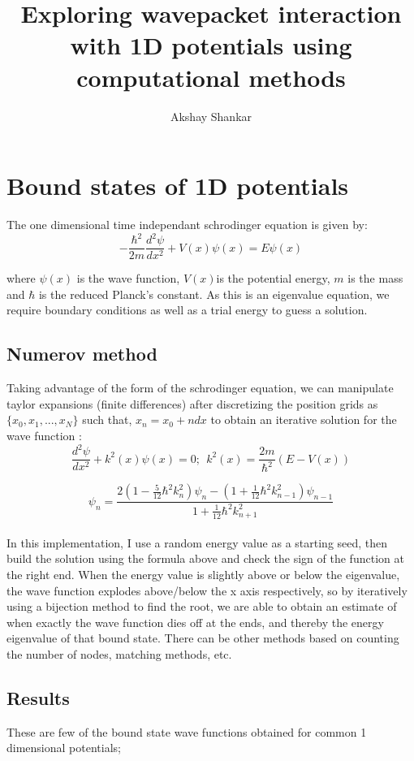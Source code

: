 \documentclass{article}
\title{Exploring wavepacket interaction with 1D potentials using computational methods}
\author{Akshay Shankar}
\begin{document}


\newpage
\tableofcontents

\newpage
{}

\section{Bound states of 1D potentials}
The one dimensional time independant schrodinger equation is given by:
$$-\frac{\hbar^2}{2m}\frac{d^2\psi}{dx^2} + V(x)\psi(x) = E\psi(x)$$

where $\psi(x)$ is the wave function, $V(x)$is the potential energy, $m$ is the mass and $\hbar$ is the reduced Planck's constant. As this is an eigenvalue equation, we require boundary conditions as well as a trial energy to guess a solution. 
\subsection{Numerov method}
Taking advantage of the form of the schrodinger equation, we can manipulate taylor expansions (finite differences) after discretizing the position grids as $\{x_0, x_1, ..., x_N\}$ such that, $x_n = x_0 + ndx$ to obtain an iterative solution for the wave function \cite{qmbook}: 
$$\frac{d^2\psi}{dx^2} + k^2(x)\psi(x) = 0; \ \ k^2(x) = \frac{2m}{\hbar^2}(E - V(x)) 
$$

$$\psi_n = \frac{2\left ( 1 - \frac{5}{12}\hbar^2k_n^2\right)\psi_n - \left ( 1 + \frac{1}{12}\hbar^2k_{n-1}^2 \right ) \psi_{n-1}}{1+\frac{1}{12}\hbar^2k_{n+1}^2}$$
\\

In this implementation, I use a random energy value as a starting seed, then build the solution using the formula above and check the sign of the function at the right end. When the energy value is slightly above or below the eigenvalue, the wave function explodes above/below the x axis respectively, so by iteratively using a bijection method to find the root, we are able to obtain an estimate of when exactly the wave function dies off at the ends, and thereby the energy eigenvalue of that bound state. There can be other methods based on counting the number of nodes, matching methods, etc.

\subsection{Results}
These are few of the bound state wave functions obtained for common 1 dimensional potentials; 
\end{document}
